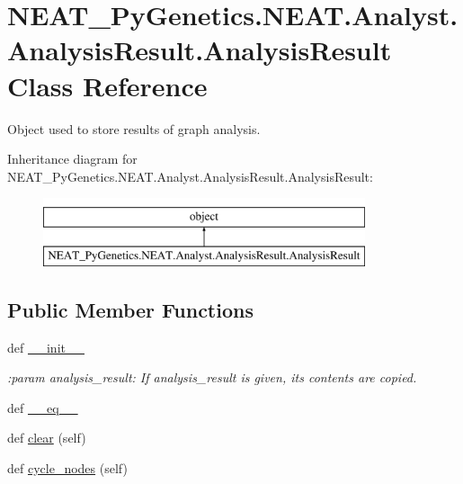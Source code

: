 \hypertarget{classNEAT__PyGenetics_1_1NEAT_1_1Analyst_1_1AnalysisResult_1_1AnalysisResult}{}\section{N\+E\+A\+T\+\_\+\+Py\+Genetics.\+N\+E\+A\+T.\+Analyst.\+Analysis\+Result.\+Analysis\+Result Class Reference}
\label{classNEAT__PyGenetics_1_1NEAT_1_1Analyst_1_1AnalysisResult_1_1AnalysisResult}


Object used to store results of graph analysis.  


Inheritance diagram for N\+E\+A\+T\+\_\+\+Py\+Genetics.\+N\+E\+A\+T.\+Analyst.\+Analysis\+Result.\+Analysis\+Result\+:\begin{figure}[H]
\begin{center}
\leavevmode
\includegraphics[height=2.000000cm]{classNEAT__PyGenetics_1_1NEAT_1_1Analyst_1_1AnalysisResult_1_1AnalysisResult}
\end{center}
\end{figure}
\subsection*{Public Member Functions}
\begin{DoxyCompactItemize}
\item 
def \hyperlink{classNEAT__PyGenetics_1_1NEAT_1_1Analyst_1_1AnalysisResult_1_1AnalysisResult_a76e2ba4c3bec7e93ab1c78e281a8504d}{\+\_\+\+\_\+init\+\_\+\+\_\+}
\begin{DoxyCompactList}\small\item\em \+:param analysis\+\_\+result\+: If analysis\+\_\+result is given, its contents are copied. \end{DoxyCompactList}\item 
def \hyperlink{classNEAT__PyGenetics_1_1NEAT_1_1Analyst_1_1AnalysisResult_1_1AnalysisResult_a6145154aa0f23413e57312a78cc12f91}{\+\_\+\+\_\+eq\+\_\+\+\_\+}
\item 
def \hyperlink{classNEAT__PyGenetics_1_1NEAT_1_1Analyst_1_1AnalysisResult_1_1AnalysisResult_abc4627be334a397f27b8173cb4a21796}{clear} (self)
\item 
def \hyperlink{classNEAT__PyGenetics_1_1NEAT_1_1Analyst_1_1AnalysisResult_1_1AnalysisResult_ad3a9bbe518536d18882346d8ee9dd28e}{cycle\+\_\+nodes} (self)
\end{DoxyCompactItemize}
